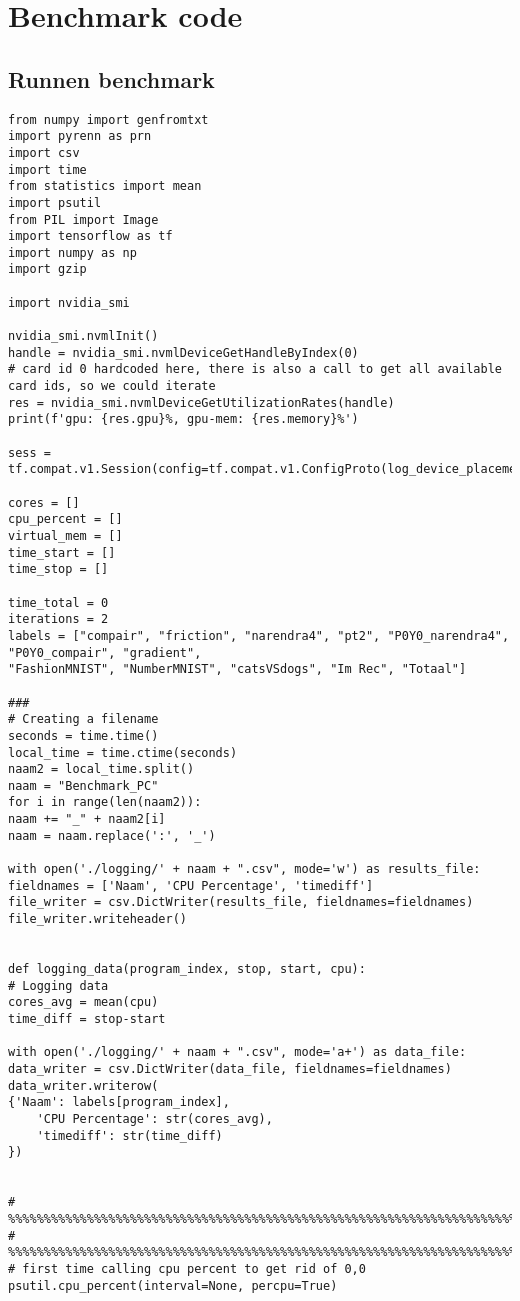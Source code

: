 \chapter{Benchmark code}

\section{Runnen benchmark}
\begin{lstlisting}
from numpy import genfromtxt
import pyrenn as prn
import csv
import time
from statistics import mean
import psutil
from PIL import Image
import tensorflow as tf
import numpy as np
import gzip

import nvidia_smi

nvidia_smi.nvmlInit()
handle = nvidia_smi.nvmlDeviceGetHandleByIndex(0)
# card id 0 hardcoded here, there is also a call to get all available card ids, so we could iterate
res = nvidia_smi.nvmlDeviceGetUtilizationRates(handle)
print(f'gpu: {res.gpu}%, gpu-mem: {res.memory}%')

sess = tf.compat.v1.Session(config=tf.compat.v1.ConfigProto(log_device_placement=True))

cores = []
cpu_percent = []
virtual_mem = []
time_start = []
time_stop = []

time_total = 0
iterations = 2
labels = ["compair", "friction", "narendra4", "pt2", "P0Y0_narendra4", "P0Y0_compair", "gradient",
"FashionMNIST", "NumberMNIST", "catsVSdogs", "Im Rec", "Totaal"]

###
# Creating a filename
seconds = time.time()
local_time = time.ctime(seconds)
naam2 = local_time.split()
naam = "Benchmark_PC"
for i in range(len(naam2)):
naam += "_" + naam2[i]
naam = naam.replace(':', '_')

with open('./logging/' + naam + ".csv", mode='w') as results_file:
fieldnames = ['Naam', 'CPU Percentage', 'timediff']
file_writer = csv.DictWriter(results_file, fieldnames=fieldnames)
file_writer.writeheader()


def logging_data(program_index, stop, start, cpu):
# Logging data
cores_avg = mean(cpu)
time_diff = stop-start

with open('./logging/' + naam + ".csv", mode='a+') as data_file:
data_writer = csv.DictWriter(data_file, fieldnames=fieldnames)
data_writer.writerow(
{'Naam': labels[program_index],
	'CPU Percentage': str(cores_avg),
	'timediff': str(time_diff)
})


# %%%%%%%%%%%%%%%%%%%%%%%%%%%%%%%%%%%%%%%%%%%%%%%%%%%%%%%%%%%%%%%%%%%%%%%%%%%%%%%%%%%%%%%
# %%%%%%%%%%%%%%%%%%%%%%%%%%%%%%%%%%%%%%%%%%%%%%%%%%%%%%%%%%%%%%%%%%%%%%%%%%%%%%%%%%%%%%%
# first time calling cpu percent to get rid of 0,0
psutil.cpu_percent(interval=None, percpu=True)


\end{lstlisting}
